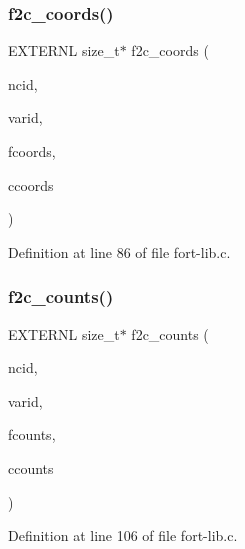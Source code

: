 \mbox{\label{fort-lib_8c_a8fc727da700ba3125fbeffcddc55a44d}} 
\subsubsection{\texorpdfstring{f2c\+\_\+coords()}{f2c\_coords()}}
{\footnotesize\ttfamily E\+X\+T\+E\+R\+NL size\+\_\+t$\ast$ f2c\+\_\+coords (\begin{DoxyParamCaption}\item[{int}]{ncid,  }\item[{int}]{varid,  }\item[{const \hyperlink{ncfortran_8h_a0fd3f9e9fc30661142a1fb549af678e7}{N\+F\+\_\+\+I\+N\+T\+E\+G\+ER} $\ast$}]{fcoords,  }\item[{size\+\_\+t $\ast$}]{ccoords }\end{DoxyParamCaption})}



Definition at line 86 of file fort-\/lib.\+c.

\mbox{\label{fort-lib_8c_ae9f58d950cd1f1d82faf784c4db2c115}} 
\subsubsection{\texorpdfstring{f2c\+\_\+counts()}{f2c\_counts()}}
{\footnotesize\ttfamily E\+X\+T\+E\+R\+NL size\+\_\+t$\ast$ f2c\+\_\+counts (\begin{DoxyParamCaption}\item[{int}]{ncid,  }\item[{int}]{varid,  }\item[{const \hyperlink{ncfortran_8h_a0fd3f9e9fc30661142a1fb549af678e7}{N\+F\+\_\+\+I\+N\+T\+E\+G\+ER} $\ast$}]{fcounts,  }\item[{size\+\_\+t $\ast$}]{ccounts }\end{DoxyParamCaption})}



Definition at line 106 of file fort-\/lib.\+c.

\mbox{\label{fort-lib_8c_a57c6778d70be42b3e959ab2343790189}} 
